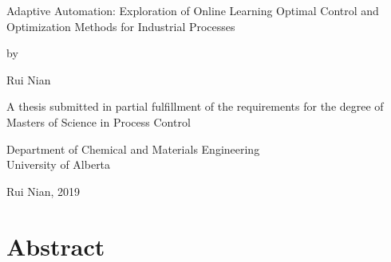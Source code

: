 \documentclass[12pt]{report}
\begin{document}
\begin{titlepage}
    \begin{center}
    
        \vspace*{1.1cm}
        
        \LARGE
        Adaptive Automation: Exploration of Online Learning Optimal Control and Optimization Methods for Industrial Processes \\
        
        \vspace{1cm}
        
        \normalsize by \\
        
        \vspace{1cm}
        
        \large Rui Nian \\
        
        \vspace{3cm}
        
        A thesis submitted in partial fulfillment of the requirements for the degree of \\
        \vspace{1cm}
        Masters of Science in Process Control \\
        
        \vspace{3.5cm}
        
        Department of Chemical and Materials Engineering \\
        University of Alberta \\
        
        \vspace{1cm}
        
        \textcopyright \hspace{1mm} Rui Nian, 2019 \\
        

    \end{center}
\end{titlepage}



\chapter*{Abstract}
\end{document}
